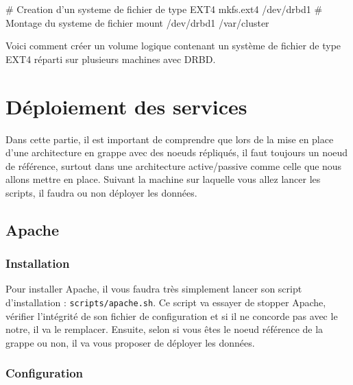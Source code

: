 \documentclass[11pt,a4paper]{report}
\begin{document}
                \begin{bashcode}
                    # Creation d'un systeme de fichier de type EXT4
                    mkfs.ext4 /dev/drbd1
                    # Montage du systeme de fichier
                    mount /dev/drbd1 /var/cluster
                \end{bashcode}
                
                Voici comment cr\'eer un volume logique contenant un syst\`eme de fichier de type EXT4 r\'eparti sur plusieurs machines avec DRBD.
                
        \section{D\'eploiement des services}
            
            Dans cette partie, il est important de comprendre que lors de la mise en place d'une architecture en grappe avec des noeuds r\'epliqu\'es, il faut toujours un noeud de r\'ef\'erence, surtout dans une architecture active/passive comme celle que nous allons mettre en place.
            Suivant la machine sur laquelle vous allez lancer les scripts, il faudra ou non d\'eployer les donn\'ees.
            
            \subsection{Apache}
                
                \subsubsection{Installation}
                    
                    Pour installer Apache, il vous faudra tr\`es simplement lancer son script d'installation : \verb+scripts/apache.sh+.
                    Ce script va essayer de stopper Apache, v\'erifier l'int\'egrit\'e de son fichier de configuration et si il ne concorde pas avec le notre, il va le remplacer. Ensuite, selon si vous \^etes le noeud r\'ef\'erence de la grappe ou non, il va vous proposer de d\'eployer les donn\'ees.
                    
                \subsubsection{Configuration}
                    
\end{document}
